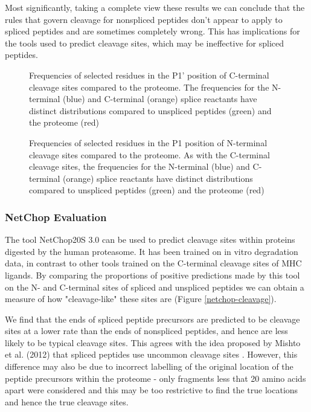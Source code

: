 \documentclass[10pt,a4paper,twoside,twocolumn]{article}
\begin{document}
Most significantly, taking a complete view these results we can conclude that the rules that govern cleavage for nonspliced peptides don't appear to apply to spliced peptides and are sometimes completely wrong. This has implications for the tools used to predict cleavage sites, which may be ineffective for spliced peptides.



	\begin{figure}
		\setlength\figureheight{4cm}
		\setlength{}
		
		\caption{Frequencies of selected residues in the P1' position of C-terminal cleavage sites compared to the proteome. The frequencies for the N-terminal (blue) and C-terminal (orange) splice reactants have distinct distributions compared to unspliced peptides (green) and the proteome (red) }
		\label{cleavage1}
	\end{figure}
		\begin{figure}
			\setlength\figureheight{4cm}
			\setlength{}
			
			\caption{Frequencies of selected residues in the P1 position of N-terminal cleavage sites compared to the proteome. As with the C-terminal cleavage sites, the frequencies for the N-terminal (blue) and C-terminal (orange) splice reactants have distinct distributions compared to unspliced peptides (green) and the proteome (red)}
			\label{cleavage2}
		\end{figure}
\subsubsection*{NetChop Evaluation}
The tool NetChop20S 3.0 can be used to predict cleavage sites within proteins digested by the human proteasome. It has been trained on in vitro degradation data, in contrast to other tools trained on the C-terminal cleavage sites of MHC ligands. By comparing the proportions of positive predictions made by this tool on the N- and C-terminal sites of spliced and unspliced peptides we can obtain a measure of how "cleavage-like" these sites are (Figure \ref{netchop-cleavage}). 

We find that the ends of spliced peptide precursors are predicted to be cleavage sites at a lower rate than the ends of nonspliced peptides, and hence are less likely to be typical cleavage sites. This agrees with the idea proposed by Mishto et al. (2012) that spliced peptides use uncommon cleavage sites \cite{Mishto2012a}. However, this difference may also be due to incorrect labelling of the original location of the peptide precursors within the proteome - only fragments less that 20 amino acids apart were considered and this may be too restrictive to find the true locations and hence the true cleavage sites. 
\end{document}
